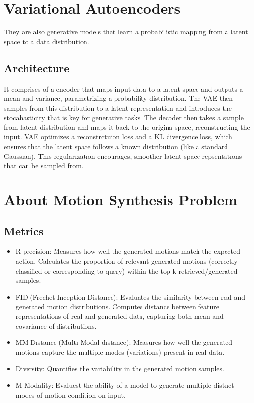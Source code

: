 \documentclass{article}
\begin{document}
\section{Variational Autoencoders}
They are also generative models that learn a probabilistic mapping from a latent space to a data distribution.
\subsection{Architecture}
It comprises of a encoder that maps input data to a latent space and outputs a mean and variance, parametrizing a
probability distribution. The VAE then samples from this distribution to a latent representation and introduces the 
stocahasticity that is key for generative tasks. The decoder then takes a sample from latent distribution and maps it back
to the origina space, reconstructing the input. VAE optimizes a reconstrctuion loss and a KL divergence loss, which ensures
that the latent space follows a known distribution (like a standard Gaussian). This regularization encourages,
smoother latent space repsentations that can be sampled from.
\section{About Motion Synthesis Problem}
\subsection{Metrics}
\begin{itemize}
	\item R-precision: Measures how well the generated motions match the expected action. Calculates the proportion of 
	relevant generated motions (correctly classified or corresponding to query) within the top k retrieved/generated samples.
	\item FID (Frechet Inception Distance): Evaluates the similarity between real and generated motion distributions. Computes distance
	between feature representations of real and generated data, capturing both mean and covariance of distributions.
	\item MM Distance (Multi-Modal distance): Measures how well the generated motions capture the multiple modes (variations)
	present in real data.
	\item Diversity: Quantifies the variability in the generated motion samples.
	\item M Modality: Evaluest the ability of a model to generate multiple distnct modes of motion condition on input.
\end{itemize}
\end{document}
